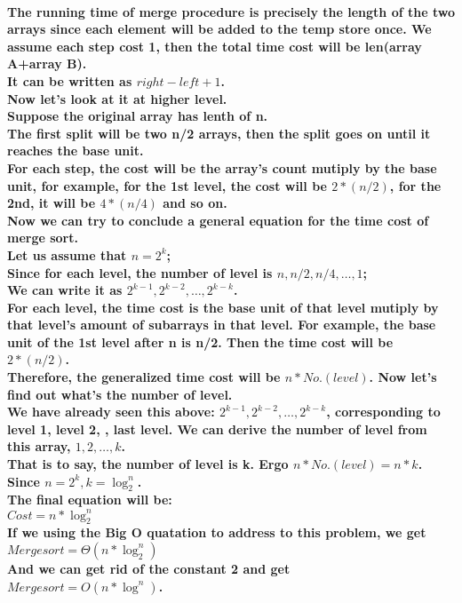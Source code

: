 \documentclass{article}
\begin{document}
\paragraph{The running time of merge procedure is precisely the length of the two arrays since each element will be added to the temp store once. We assume each step cost 1, then the total time cost will be len(array A+array B).\\
It can be written as $right - left + 1$.\\
Now let's look at it at higher level.\\
Suppose the original array has lenth of n.\\
The first split will be two n/2 arrays, then the split goes on until it reaches the base unit.\\
For each step, the cost will be the array's count mutiply by the base unit, for example, for the 1st level, the cost will be $2*(n/2)$, for the 2nd, it will be $4*(n/4)$ and so on.\\
Now we can try to conclude a general equation for the time cost of merge sort.\\
Let us assume that $n = 2^k$;\\
Since for each level, the number of level is $n, n/2, n/4, \ldots ,1$;\\
We can write it as $2^{k-1},2^{k-2}, \ldots ,2^{k-k}$.\\
For each level, the time cost is the base unit of that level mutiply by that level's amount of subarrays in that level. For example, the base unit of the 1st level after n is n/2. Then the time cost will be $2 * (n/2)$.\\
Therefore, the generalized time cost will be $n * No.(level)$. Now let's find out what's the number of level. \\
We have already seen this above: $2^{k-1},2^{k-2}, \ldots ,2^{k-k}$, corresponding to level 1, level 2, \textellipsis, last level. We can derive the number of level from this array, $1,2, \ldots ,k$.\\
That is to say, the number of level is k. Ergo $n * No.(level) = n * k$.\\
Since $n = 2^k, k = \log_2^n$.\\
The final equation will be:\\
$Cost = n * \log_2^n$\\
If we using the Big O quatation to address to this problem, we get\\
$Mergesort = \Theta(n * \log_2^n)$\\
And we can get rid of the constant 2 and get\\
$Mergesort = O(n * \log^n)$.}
\end{document}
